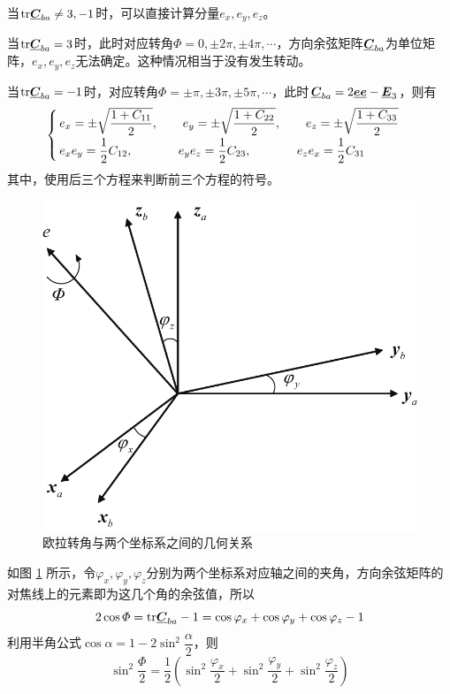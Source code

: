 \noa[1] 当$\text{tr} \underline{\bm{C}}_{ba} \neq 3, -1$时，可以直接计算分量$e_x, e_y, e_z$。

\noa[2] 当$\text{tr} \underline{\bm{C}}_{ba} = 3$时，此时对应转角$\varPhi = 0, \pm 2 \pi, \pm 4 \pi, \cdots$，方向余弦矩阵$\underline{\bm{C}}_{ba}$为单位矩阵，$e_x, e_y, e_z$无法确定。这种情况相当于没有发生转动。

\noa[3] 当$\text{tr} \underline{\bm{C}}_{ba} = -1$时，对应转角$\varPhi = \pm \pi, \pm 3 \pi, \pm 5 \pi, \cdots$，此时$\underline{\bm{C}}_{ba} = 2 \underline{\bm{e}}\underline{\bm{e}} - \underline{\bm{E}}_3$，则有
\begin{equation}
	\begin{cases}
		\, e_x = \pm \sqrt{\dfrac{1 + C_{11}}{2}}, \qquad e_y = \pm \sqrt{\dfrac{1+ C_{22}}{2}}, \qquad e_z = \pm \sqrt{\dfrac{1 + C_{33}}{2}} \\[0.5em]
		\, e_x e_y = \dfrac{1}{2} C_{12}, \hspace*{3.7em} e_ye_z = \dfrac{1}{2}C_{23}, \hspace*{3.7em} e_ze_x = \dfrac{1}{2} C_{31}
	\end{cases}
\end{equation}
其中，使用后三个方程来判断前三个方程的符号。

\begin{figure}[!htb]
	\centering
	\includegraphics[width=0.42\linewidth]{pic/欧拉轴角变换}
	\vspace*{-1em}
	\caption{欧拉转角与两个坐标系之间的几何关系}
	\label{欧拉转角变换}
\end{figure}


\sssection[欧拉转角的几何意义]

如图 \ref{欧拉转角变换} 所示，令$\varphi_x, \varphi_y, \varphi_z$分别为两个坐标系对应轴之间的夹角，方向余弦矩阵的对焦线上的元素即为这几个角的余弦值，所以
\begin{equation}
	2 \cos \varPhi = \text{tr} \underline{\bm{C}}_{ba} - 1 = \cos \varphi_x + \cos \varphi_y + \cos \varphi_z - 1
\end{equation}
利用半角公式$\cos \alpha = 1 - 2 \sin^2 \dfrac{\alpha}{2}$，则
\begin{equation}
	\sin^2 \dfrac{\varPhi}{2} = \dfrac{1}{2} \left( \sin^2 \dfrac{\varphi_x}{2} + \sin^2 \dfrac{\varphi_y}{2} + \sin^2 \dfrac{\varphi_z}{2} \right)
\end{equation}

